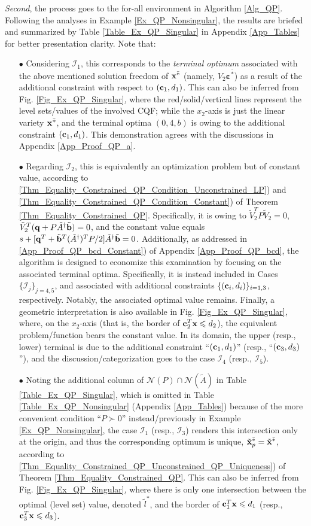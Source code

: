 \documentclass{imaman}
\newcommand{\bfb}{{\bf b}}
\newcommand{\bfc}{{\bf c}}
\newcommand{\bfx}{{\bf x}}
\newcommand{\bfq}{{\bf q}}
\newcommand{\bfvarepsilon}{{\boldsymbol \varepsilon}}
\newcommand{\calI}{{\mathcal I}}
\newcommand{\calN}{{\mathcal N}}
\numberwithin{equation}{section}
\begin{document}
\begin{example}
\textit{Second}, the process goes to the for-all environment in Algorithm \ref{Alg_QP}. Following the analyses in Example \ref{Ex_QP_Nonsingular}, the results are briefed and summarized by Table \ref{Table_Ex_QP_Singular} in Appendix \ref{App_Tables} for better presentation clarity. Note that:
\begin{enumerate}
\item[$\bullet$] Considering $\calI_1$, this corresponds to the \textit{terminal optimum} associated with the above mentioned solution freedom of $\bfx^{\bar *}$ (namely, $V_2\bfvarepsilon^{\bar *}$) as a result of the additional constraint with respect to $(\bfc_1,d_1)$. This can also be inferred from Fig. \ref{Fig_Ex_QP_Singular}, where the red/solid/vertical lines represent the level sets/values of the involved CQF; while the $x_2$-axis is just the linear variety $\bfx^{\bar *}$, and the terminal optima $(0,4,b)$ is owing to the additional constraint $(\bfc_1,d_1)$. This demonstration agrees with the discussions in Appendix \ref{App_Proof_QP_a}.
\item[$\bullet$] Regarding $\calI_2$, this is equivalently an optimization problem but of constant value, according to \ref{Thm_Equality_Constrained_QP_Condition_Unconstrained_LP}) and \ref{Thm_Equality_Constrained_QP_Condition_Constant}) of Theorem \ref{Thm_Equality_Constrained_QP}. Specifically, it is owing to $\tilde V_2^TP\tilde V_2=0$, $\tilde V_2^T(\bfq+P\tilde A^\dagger\tilde \bfb)=0$, and the constant value equals $s+[\bfq^T+\tilde\bfb^T(\tilde A^\dagger)^TP/2]\tilde A^\dagger\tilde\bfb=0$. Additionally, as addressed in \ref{App_Proof_QP_bcd_Constant}) of Appendix \ref{App_Proof_QP_bcd}, the algorithm is designed to economize this examination by focusing on the associated terminal optima. Specifically, it is instead included in Cases $\{\calI_j\}_{j=4,5}$, and associated with additional constraints $\{(\bfc_i,d_i)\}_{i=1,3}$, respectively. Notably, the associated optimal value remains. Finally, a geometric interpretation is also available in Fig. \ref{Fig_Ex_QP_Singular}, where, on the $x_2$-axis (that is, the border of $\bfc_2^T\bfx\le d_2$), the equivalent problem/function bears the constant value. In its domain, the upper (resp., lower) terminal is due to the additional constraint ``$(\bfc_1,d_1)$'' (resp., ``$(\bfc_3,d_3)$''), and the discussion/categorization goes to the case $\calI_4$ (resp., $\calI_5$).
\item[$\bullet$] Noting the additional column of $\calN(P)\cap\calN(\tilde A)$ in Table \ref{Table_Ex_QP_Singular}, which is omitted in Table \ref{Table_Ex_QP_Nonsingular} (Appendix \ref{App_Tables}) because of the more convenient condition ``$P\succ 0$'' instead/previously in Example \ref{Ex_QP_Nonsingular}, the case $\calI_1$ (resp., $\calI_3$) renders this intersection only at the origin, and thus the corresponding optimum is unique, $\tilde\bfx_p^{\bar *}=\tilde\bfx^{\bar *}$, according to \ref{Thm_Equality_Constrained_QP_Unconstrained_QP_Uniqueness}) of Theorem \ref{Thm_Equality_Constrained_QP}. This can also be inferred from Fig. \ref{Fig_Ex_QP_Singular}, where there is only one intersection between the optimal (level set) value, denoted $\tilde l^*$, and the border of $\bfc_1^T\bfx\le d_1$ (resp., $\bfc_3^T\bfx\le d_3$).

\end{enumerate}
\end{example}
\end{document}

